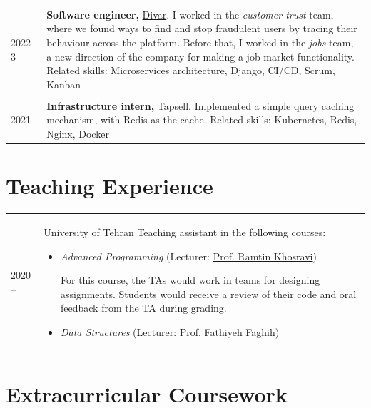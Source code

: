 \documentclass[11pt]{article}
\begin{document}
\begin{tabular}{p{} p{}}
  2022--3 & \textbf{Software engineer,} 
  \href{https://divar.ir/about}{Divar}. \newline
  I worked in the \emph{customer trust} team,
  where we found ways to find and stop fraudulent users
  by tracing their behaviour across the platform.
  Before that, I worked in the \emph{jobs} team,
  a new direction of the company
  for making a job market functionality. \vspace{2mm} \newline
  Related skills:
  Microservices architecture, Django, CI/CD,
  Scrum, Kanban \\
  \\
  2021 & \textbf{Infrastructure intern,}
  \href{https://tapsell.ir/en/}{Tapsell}. \newline
  Implemented a simple query caching mechanism,
  with Redis as the cache. \newline
  Related skills: Kubernetes, Redis, Nginx, Docker
\end{tabular}

\section*{Teaching Experience}

\begin{tabular}{p{} p{}}
  2020 -- \newline 2022 & University of Tehran \newline
  Teaching assistant in the following courses: 
  \begin{itemize}[noitemsep,left=4mm]
    \item \vspace{-0.2cm}\textit{Advanced Programming} (Lecturer:
    \href{https://scholar.google.com/citations?user=b9ib0IYAAAAJ}
    {Prof. Ramtin Khosravi})

    For this course, the TAs would work in teams for designing assignments.
    Students would receive a review of their code
    and oral feedback from the TA during grading. \vspace{2mm}
    \item \textit{Data Structures} (Lecturer:
    \href{https://scholar.google.co.uk/citations?user=Gr6IjigAAAAJ}
    {Prof. Fathiyeh Faghih})
  \end{itemize}
\end{tabular}

\section*{Extracurricular Coursework}
\end{document}
